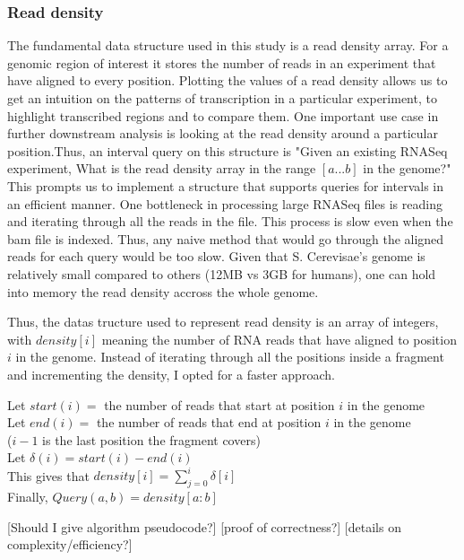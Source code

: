 \documentclass[12pt]{article}
\begin{document}
\subsubsection{Read density}\label{density}
The fundamental data structure used in this study is a read density array. For a genomic region of interest it stores the number of reads in an experiment that have aligned to every position. Plotting the values of a read density allows us to get an intuition on the patterns of transcription in a particular experiment, to highlight transcribed regions and to compare them. One important use case in further downstream analysis is looking at the read density around a particular position.Thus, an interval query on this structure is "Given an existing RNASeq experiment, What is the read density array in the range $[a...b]$ in the genome?" 
This prompts us to implement a structure that supports queries for intervals in an efficient manner. One bottleneck in processing large RNASeq files is reading and iterating through all the reads in the file. This process is slow even when the bam file is indexed. Thus, any naive method that would go through the aligned reads for each query would be too slow. Given that S. Cerevisae's genome is relatively small compared to others (12MB vs 3GB for humans), one can hold into memory the read density accross the whole genome.

Thus, the datas tructure used to represent read density is an array of integers, with $density[i]$ meaning the number of RNA reads that have aligned to position $i$ in the genome. Instead of iterating through all the positions inside a fragment and incrementing the density, I opted for a faster approach. 

\begin{center}
Let $start(i) =$ the number of reads that start at position $i$ in the genome \\
Let $end(i) =$ the number of reads that end at position $i$ in the genome \\
($i-1$ is the last position the fragment covers) \\
Let $\delta(i) = start(i) - end(i)$ \\
This gives that $density[i] = \sum\limits_{j=0}^i \delta[i]$ \\
Finally, $Query(a, b) = density[a:b]$

\end{center}

[Should I give algorithm pseudocode?]
[proof of correctness?]
[details on complexity/efficiency?]
\end{document}
